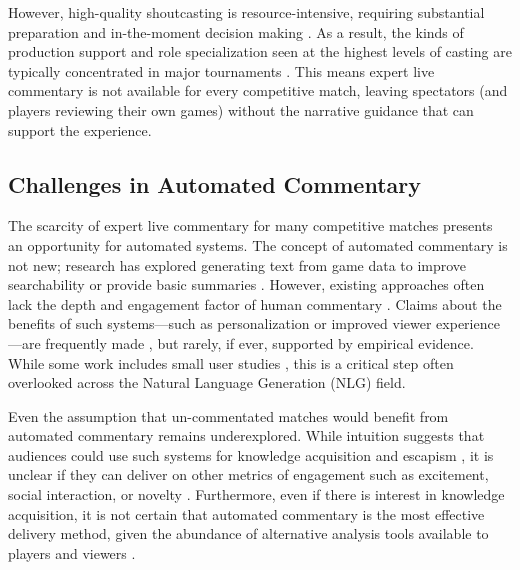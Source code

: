 However, high-quality shoutcasting is resource-intensive, requiring substantial preparation and in-the-moment decision making \cite{li2020}. As a result, the kinds of production support and role specialization seen at the highest levels of casting are typically concentrated in major tournaments \cite{kempecook2019}. This means expert live commentary is not available for every competitive match, leaving spectators (and players reviewing their own games) without the narrative guidance that can support the experience.

\subsection{Challenges in Automated Commentary}
The scarcity of expert live commentary for many competitive matches presents an opportunity for automated systems. The concept of automated commentary is not new; research has explored generating text from game data to improve searchability or provide basic summaries \cite{wang2021}. However, existing approaches often lack the depth and engagement factor of human commentary \cite{zhang2022, wang2021}. Claims about the benefits of such systems—such as personalization or improved viewer experience—are frequently made \cite{wang2021, zheng2025}, but rarely, if ever, supported by empirical evidence. While some work includes small user studies \cite{elarewaju2020,wang2021}, this is a critical step often overlooked \cite{vanderlee2019} across the Natural Language Generation (NLG) field.

Even the assumption that un-commentated matches would benefit from automated commentary remains underexplored. While intuition suggests that audiences could use such systems for knowledge acquisition and escapism \cite{hamari2017}, it is unclear if they can deliver on other metrics of engagement such as excitement, social interaction, or novelty \cite{qian2020}. Furthermore, even if there is interest in knowledge acquisition, it is not certain that automated commentary is the most effective delivery method, given the abundance of alternative analysis tools available to players and viewers \cite{block2018, penney2018}.

